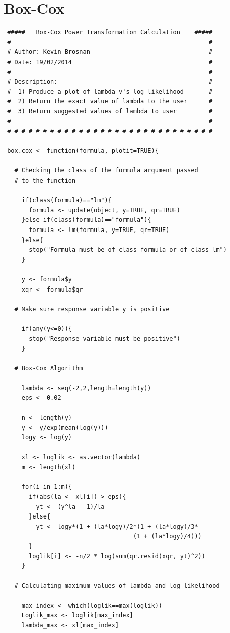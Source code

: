 \documentclass[12pt,a4paper]{report}
\begin{document}
\section{Box-Cox} \label{App:BoxCox}
\begin{lstlisting}
 #####   Box-Cox Power Transformation Calculation    #####
 #                                                       #
 # Author: Kevin Brosnan                                 #
 # Date: 19/02/2014                                      #
 #                                                       #
 # Description:                                          #
 #  1) Produce a plot of lambda v's log-likelihood       #
 #  2) Return the exact value of lambda to the user      #
 #  3) Return suggested values of lambda to user         #
 #                                                       #
 # # # # # # # # # # # # # # # # # # # # # # # # # # # # #

 box.cox <- function(formula, plotit=TRUE){

   # Checking the class of the formula argument passed
   # to the function

     if(class(formula)=="lm"){
       formula <- update(object, y=TRUE, qr=TRUE)
     }else if(class(formula)=="formula"){
       formula <- lm(formula, y=TRUE, qr=TRUE)
     }else{
       stop("Formula must be of class formula or of class lm")
     }

     y <- formula$y
     xqr <- formula$qr

   # Make sure response variable y is positive

     if(any(y<=0)){
       stop("Response variable must be positive")
     }

   # Box-Cox Algorithm

     lambda <- seq(-2,2,length=length(y))
     eps <- 0.02

     n <- length(y)
     y <- y/exp(mean(log(y)))
     logy <- log(y)

     xl <- loglik <- as.vector(lambda)
     m <- length(xl)

     for(i in 1:m){
       if(abs(la <- xl[i]) > eps){
         yt <- (y^la - 1)/la
       }else{
         yt <- logy*(1 + (la*logy)/2*(1 + (la*logy)/3*
                                    (1 + (la*logy)/4)))
       }
       loglik[i] <- -n/2 * log(sum(qr.resid(xqr, yt)^2))
     }

   # Calculating maximum values of lambda and log-likelihood

     max_index <- which(loglik==max(loglik))
     Loglik_max <- loglik[max_index]
     lambda_max <- xl[max_index]


\end{lstlisting}
\end{document}

